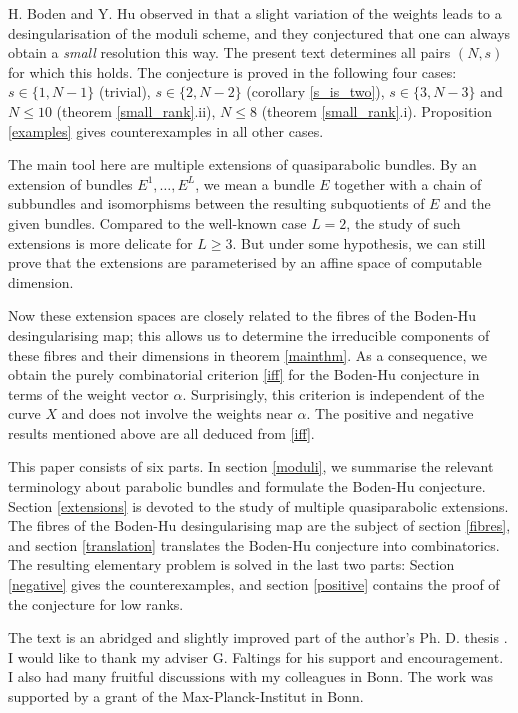 \documentclass{article}
\begin{document}
H. Boden and Y. Hu observed in \cite{boden} that a slight variation of the weights leads to a desingularisation of the moduli scheme, and they conjectured
that one can always obtain a \emph{small} resolution this way. The present text determines all pairs $(N, s)$ for which this holds. The conjecture is
proved in the following four cases: $s \in \{1, N-1\}$ (trivial), $s \in \{2, N-2\}$ (corollary \ref{s_is_two}), $s \in \{3, N-3\}$ and $N \leq 10$
(theorem \ref{small_rank}.ii), $N \leq 8$ (theorem \ref{small_rank}.i). Proposition \ref{examples} gives counterexamples in all other cases.

The main tool here are multiple extensions of quasiparabolic bundles. By an extension of bundles $E^1, \ldots, E^L$, we mean a bundle $E$ together with a
chain of subbundles and isomorphisms between the resulting subquotients of $E$ and the given bundles. Compared to the well-known case $L=2$, the study
of such extensions is more delicate for $L \geq 3$. But under some hypothesis, we can still prove that the extensions are parameterised by an affine space
of computable dimension.

Now these extension spaces are closely related to the fibres of the Boden-Hu desingularising map; this allows us to determine the irreducible components
of these fibres and their dimensions in theorem \ref{mainthm}. As a consequence, we obtain the purely combinatorial criterion \ref{iff} for the Boden-Hu
conjecture in terms of the weight vector $\alpha$. Surprisingly, this criterion is independent of the curve $X$ and does not involve the weights near
$\alpha$. The positive and negative results mentioned above are all deduced from \ref{iff}.

This paper consists of six parts. In section \ref{moduli}, we summarise the relevant terminology about parabolic bundles and formulate the Boden-Hu
conjecture. Section \ref{extensions} is devoted to the study of multiple quasiparabolic extensions. The fibres of the Boden-Hu desingularising map are
the subject of section \ref{fibres}, and section \ref{translation} translates the Boden-Hu conjecture into combinatorics. The resulting elementary
problem is solved in the last two parts: Section \ref{negative} gives the counterexamples, and section \ref{positive} contains the proof of the
conjecture for low ranks.

The text is an abridged and slightly improved part of the author's Ph. D. thesis \cite{diss}. I would like to thank my adviser G. Faltings for his support
and encouragement. I also had many fruitful discussions with my colleagues in Bonn. The work was supported by a grant of the Max-Planck-Institut in Bonn.
\end{document}
